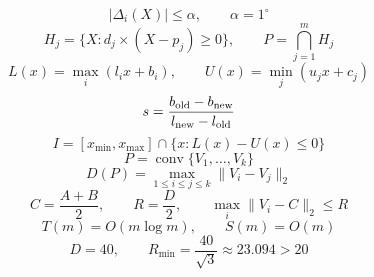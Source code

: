 \documentclass{article}
\begin{document}
\[
|\Delta_i(X)|\leq\alpha,\qquad\alpha=1^{\circ}
\]
\[
H_j=\{X:d_j\times(X-p_j)\geq0\},\qquad P=\bigcap_{j=1}^{m}H_j
\]
\[
L(x)=\max_i(l_i x+b_i),\qquad U(x)=\min_j(u_j x+c_j)
\]
\[
s=\frac{b_{\rm old}-b_{\rm new}}{l_{\rm new}-l_{\rm old}}
\]
\[
I=[x_{\min},x_{\max}]\cap\{x:L(x)-U(x)\leq0\}
\]
\[
P=\operatorname{conv}\{V_1,\ldots,V_k\}
\]
\[
D(P)=\max_{1\leq i\leq j\leq k}\|V_i-V_j\|_2
\]
\[
C=\frac{A+B}{2},\qquad R=\frac{D}{2},\qquad \max_i\|V_i-C\|_2\leq R
\]
\[
T(m)=O(m\log m),\qquad S(m)=O(m)
\]
\[
D=40,\qquad R_{\min}=\frac{40}{\sqrt{3}}\approx23.094>20
\]
\end{document}
